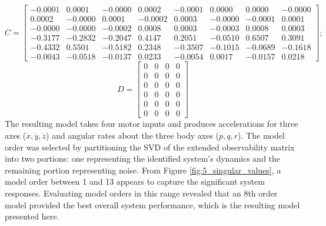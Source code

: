 \begin{equation*}
C = \begin{bmatrix}
-0.0001&0.0001&-0.0000&0.0002&-0.0001&0.0000&0.0000&-0.0000\\
0.0002&-0.0000&0.0001&-0.0002&0.0003&-0.0000&-0.0001&0.0001\\
-0.0000&-0.0000&-0.0002&0.0008&0.0003&-0.0003&0.0008&0.0003\\
-0.3177&-0.2832&-0.2047&0.4147&0.2051&-0.0510&0.6507&0.3091\\
-0.4332&0.5501&-0.5182&0.2348&-0.3507&-0.1015&-0.0689&-0.1618\\
-0.0043&-0.0518&-0.0137&0.0233&-0.0054&0.0017&-0.0157&0.0218
\end{bmatrix};
\end{equation*} 
\begin{equation*}
D = \begin{bmatrix}
0&0&0&0\\
0&0&0&0\\
0&0&0&0\\
0&0&0&0\\
0&0&0&0\\
0&0&0&0
\end{bmatrix}
\end{equation*}
\normalsize %
The resulting model takes four motor inputs and produces accelerations for three axes ($\ddot x, \ddot y, \ddot z$) and angular rates about the three body axes ($p, q, r$). The model order was selected by partitioning the SVD of the extended observability matrix into two portions: one representing the identified system's dynamics and the remaining portion representing noise. From Figure \ref{fig:5_singular_values}, a model order between 1 and 13 appears to capture the significant system responses. Evaluating model orders in this range revealed that an 8th order model provided the best overall system performance, which is the resulting model presented here. 















